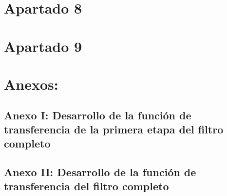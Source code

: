 \documentclass[12pt]{article}
\begin{document}
  \section*{Apartado 8}
  \section*{Apartado 9}
  \newpage
  \section*{Anexos: }
  \subsection*{Anexo I: Desarrollo de la función de transferencia de la primera etapa del filtro completo}
  \subsection*{Anexo II: Desarrollo de la función de transferencia del filtro completo}
\end{document}
